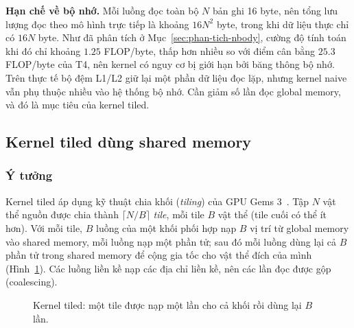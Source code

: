 \textbf{Hạn chế về bộ nhớ.} Mỗi luồng đọc toàn bộ $N$ bản ghi 16 byte, nên tổng lưu lượng đọc theo mô hình trực tiếp là khoảng $16N^2$ byte, trong khi dữ liệu thực chỉ có $16N$ byte. Như đã phân tích ở Mục~\ref{sec:phan-tich-nbody}, cường độ tính toán khi đó chỉ khoảng $1.25$ FLOP/byte, thấp hơn nhiều so với điểm cân bằng $25.3$ FLOP/byte của T4, nên kernel có nguy cơ bị giới hạn bởi băng thông bộ nhớ. Trên thực tế bộ đệm L1/L2 giữ lại một phần dữ liệu đọc lặp, nhưng kernel naive vẫn phụ thuộc nhiều vào hệ thống bộ nhớ. Cần giảm số lần đọc global memory, và đó là mục tiêu của kernel tiled.

\subsection{Kernel tiled dùng shared memory}

\subsubsection{Ý tưởng}

Kernel tiled áp dụng kỹ thuật chia khối (\emph{tiling}) của GPU Gems 3~\cite{gpugems3}. Tập $N$ vật thể nguồn được chia thành $\lceil N/B \rceil$ \emph{tile}, mỗi tile $B$ vật thể (tile cuối có thể ít hơn). Với mỗi tile, $B$ luồng của một khối phối hợp nạp $B$ vị trí từ global memory vào shared memory, mỗi luồng nạp một phần tử; sau đó mỗi luồng dùng lại cả $B$ phần tử trong shared memory để cộng gia tốc cho vật thể đích của mình (Hình~\ref{fig:tiled}). Các luồng liền kề nạp các địa chỉ liền kề, nên các lần đọc được gộp (coalescing).

\begin{figure}[H]
\centering
{}
\caption{Kernel tiled: một tile được nạp một lần cho cả khối rồi dùng lại $B$ lần.}
\label{fig:tiled}
\end{figure}


